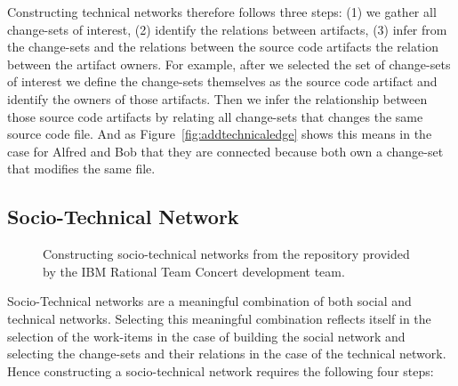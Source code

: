 Constructing technical networks therefore follows three steps: (1) we gather all change-sets of interest, (2) identify the relations between artifacts, (3) infer from the change-sets and the relations between the source code artifacts the relation between the artifact owners.
For example, after we selected the set of change-sets of interest we define the change-sets themselves as the source code artifact and identify the owners of those artifacts.
Then we infer the relationship between those source code artifacts by relating all change-sets that changes the same source code file.
And as Figure~\ref{fig:addtechnicaledge} shows this means in the case for Alfred and Bob that they are connected because both own a change-set that modifies the same file.

\subsection{Socio-Technical Network}
\begin{figure}[t!]
%	
  \centering
  \hspace{8pt}
  
    \hspace{8pt}
  \caption{Constructing socio-technical networks from the repository provided by the IBM Rational Team Concert development team.}
  \label{fig:construct-stc}
\end{figure}

Socio-Technical networks are a meaningful combination of both social and technical networks.
Selecting this meaningful combination reflects itself in the selection of the work-items in the case of building the social network and selecting the change-sets and their relations in the case of the technical network.
Hence constructing a socio-technical network requires the following four steps:

